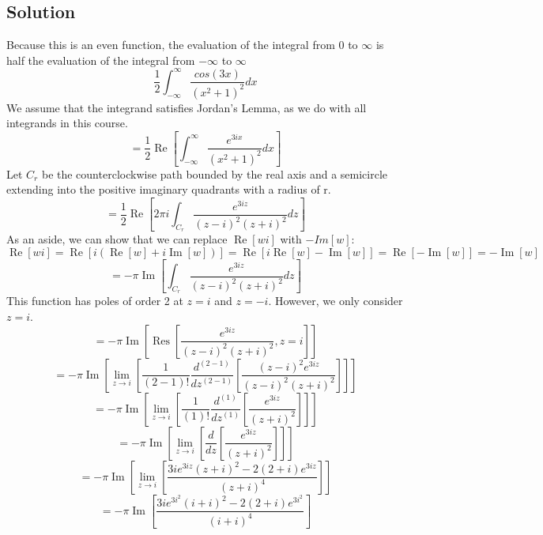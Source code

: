 \documentclass[12pt]{article}
\newcommand{\Res}{\operatorname{Res}}
\renewcommand{\Re}{\operatorname{Re}}
\renewcommand{\Im}{\operatorname{Im}}
\begin{document}
\subsection{Solution}
Because this is an even function, the evaluation of the integral from $0$ to $\infty$ is half the evaluation of the integral from $-\infty$ to $\infty$
\begin{equation}
	\frac{1}{2}\int_{-\infty}^{\infty}\frac{cos(3x)}{(x^2+1)^2}dx
\end{equation}
We assume that the integrand satisfies Jordan's Lemma, as we do with all integrands in this course.
\begin{equation}
	=\frac{1}{2}\Re[\int_{-\infty}^{\infty}\frac{e^{3ix}}{(x^2+1)^2}dx]
\end{equation}
Let $C_r$ be the counterclockwise path bounded by the real axis and a semicircle extending into the positive imaginary quadrants with a radius of r.
\begin{equation}
	=\frac{1}{2}\Re[2\pi i\int_{C_r}\frac{e^{3iz}}{(z-i)^2(z+i)^2}dz]
\end{equation}
As an aside, we can show that we can replace $\Re[wi]$ with $-Im[w]$:
\begin{equation}
	\Re[wi]=\Re[i(\Re[w]+i\Im[w])]=\Re[i\Re[w]-\Im[w]]=\Re[-\Im[w]]=-\Im[w]
\end{equation}
\begin{equation}
	=-\pi\Im[\int_{C_r}\frac{e^{3iz}}{(z-i)^2(z+i)^2}dz]
\end{equation}
This function has poles of order 2 at $z=i$ and $z=-i$.  However, we only consider $z=i$.
\begin{equation}
	=-\pi\Im[\Res[\frac{e^{3iz}}{(z-i)^2(z+i)^2}, z=i]]
\end{equation}
\begin{equation}
	=-\pi\Im[\lim_{z\to i}[\frac{1}{(2-1)!}\frac{d^{(2-1)}}{dz^{(2-1)}}[\frac{(z-i)^2e^{3iz}}{(z-i)^2(z+i)^2}]]]
\end{equation}
\begin{equation}
	=-\pi\Im[\lim_{z\to i}[\frac{1}{(1)!}\frac{d^{(1)}}{dz^{(1)}}[\frac{e^{3iz}}{(z+i)^2}]]]
\end{equation}
\begin{equation}
	=-\pi\Im[\lim_{z\to i}[\frac{d}{dz}[\frac{e^{3iz}}{(z+i)^2}]]]
\end{equation}
\begin{equation}
	=-\pi\Im[\lim_{z\to i}[\frac{3ie^{3iz}(z+i)^2-2(2+i)e^{3iz}}{(z+i)^4}]]
\end{equation}
\begin{equation}
	=-\pi\Im[\frac{3ie^{3i^2}(i+i)^2-2(2+i)e^{3i^2}}{(i+i)^4}]
\end{equation}
\end{document}
